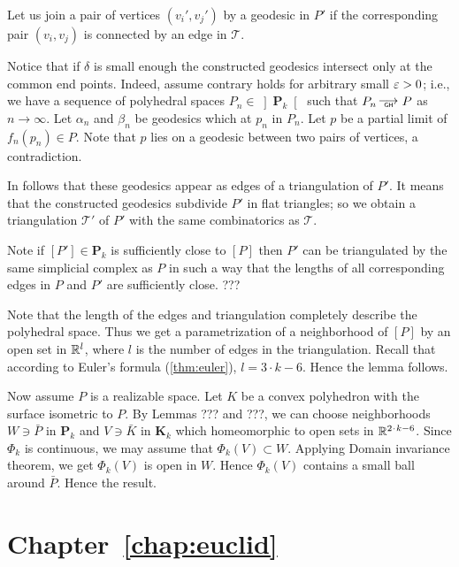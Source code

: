 Let us join a pair of vertices $(v_i',v_j')$ by a geodesic in $P'$
if the corresponding pair $(v_i,v_j)$ is connected by an edge 
in $\mathcal{T}$.

Notice that if $\delta$ is small enough
the constructed geodesics intersect only at the common end points. 
Indeed, assume contrary holds for arbitrary small $\varepsilon>0$;
i.e., we have a sequence of polyhedral spaces 
$P_n\in\left]\mathbf{P}_k\right[$
such that $P_n\GHto P$ 
as $n\to\infty$.
Let $\alpha_n$ and $\beta_n$ be geodesics which at $p_n$ in $P_n$.
Let $p$ be a partial limit of $f_n(p_n)\in P$.
Note that $p$ lies on a geodesic between two pairs of vertices,
a contradiction. 


In follows that these geodesics appear as edges 
of a triangulation of $P'$.
It means that the constructed geodesics subdivide $P'$
in flat triangles;
so we obtain a triangulation $\mathcal{T}'$ 
of $P'$ 
with the same combinatorics as $\mathcal{T}$.


Note if $[P']\in\mathbf{P}_k$ 
is sufficiently close to $[P]$ then $P'$ can be triangulated by the same simplicial complex as $P$ in such a way that the lengths of all corresponding edges in $P$ and $P'$ are sufficiently close. 
???

Note that the length of the edges and triangulation completely describe the polyhedral space.
Thus we get a parametrization of a neighborhood of $[P]$ 
by an open set in $\mathbb{R}^l$, where $l$ is the number of edges in the triangulation.
Recall that according to Euler's formula (\ref{thm:euler}), 
$l=3\cdot k-6$.
Hence the lemma follows.

Now assume $P$ is a realizable space.
Let $K$ be a convex polyhedron with the surface isometric to $P$.
By Lemmas ??? and ???, we can choose neighborhoods $W\ni \bar P$ in $\mathbf{P}_k$ 
and $V\ni \bar K$ in $\mathbf{K}_k$ which homeomorphic to open sets in $\RR^{2\cdot k-6}$.
Since $\Phi_k$ is continuous, we may assume that $\Phi_k(V)\subset W$.
Applying Domain invariance theorem, 
we get $\Phi_k(V)$ is open in $W$.
Hence $\Phi_k(V)$ contains a small ball around $\bar P$.
Hence the result.






\section*{Chapter~\ref{chap:euclid}}

